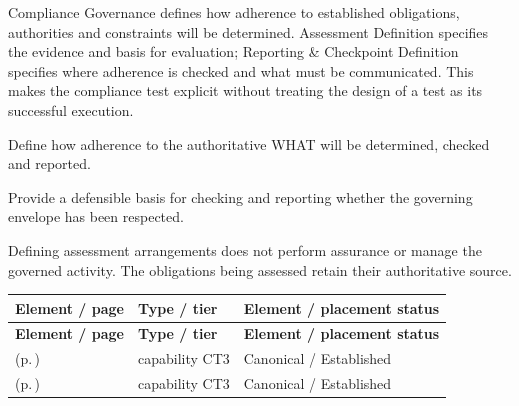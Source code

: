 Compliance Governance defines how adherence to established obligations, authorities and constraints will be determined. Assessment Definition specifies the evidence and basis for evaluation; Reporting \& Checkpoint Definition specifies where adherence is checked and what must be communicated. This makes the compliance test explicit without treating the design of a test as its successful execution.



Define how adherence to the authoritative WHAT will be determined, checked and reported.



Provide a defensible basis for checking and reporting whether the governing envelope has been respected.



Defining assessment arrangements does not perform assurance or manage the governed activity. The obligations being assessed retain their authoritative source.


\begingroup\small\setlength{\TableWidth}{\dimexpr\linewidth-6\tabcolsep-4\arrayrulewidth\relax}
\begin{longtable}{|>{\raggedright\arraybackslash}p{0.52\TableWidth}|>{\raggedright\arraybackslash}p{0.2\TableWidth}|>{\raggedright\arraybackslash}p{0.28\TableWidth}|}
\hline\rowcolor{TableHead}\textbf{Element / page} & \textbf{Type / tier} & \textbf{Element / placement status}\\\hline\endfirsthead
\hline\rowcolor{TableHead}\textbf{Element / page} & \textbf{Type / tier} & \textbf{Element / placement status}\\\hline\endhead
\hline\endfoot
\nameref{cap:bc-compliance-assessment-definition} (p.\,\pageref{cap:bc-compliance-assessment-definition}) & capability CT3 & Canonical / Established\\\hline
\nameref{cap:bc-governance-reporting-checkpoint-definition} (p.\,\pageref{cap:bc-governance-reporting-checkpoint-definition}) & capability CT3 & Canonical / Established\\\hline
\end{longtable}\endgroup

